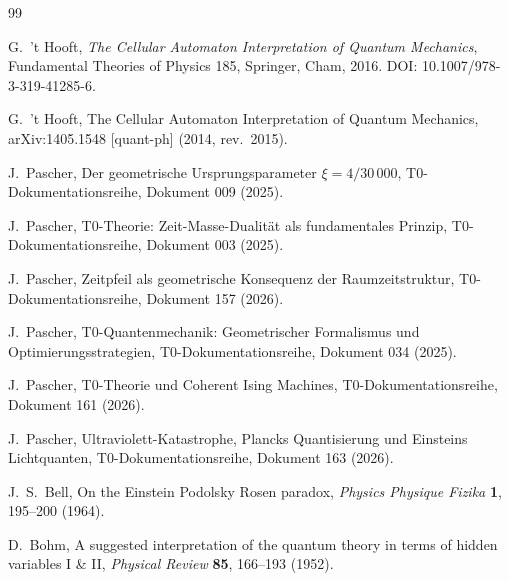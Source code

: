 \begin{thebibliography}{99}

G.\ 't Hooft,
\newblock \emph{The Cellular Automaton Interpretation of Quantum Mechanics},
\newblock Fundamental Theories of Physics 185,
\newblock Springer, Cham, 2016.
\newblock DOI: 10.1007/978-3-319-41285-6.

G.\ 't Hooft,
\newblock The Cellular Automaton Interpretation of Quantum Mechanics,
\newblock arXiv:1405.1548 [quant-ph] (2014, rev.\ 2015).

J.\ Pascher,
\newblock Der geometrische Ursprungsparameter $\xi = 4/30\,000$,
\newblock T0-Dokumentationsreihe, Dokument 009 (2025).

J.\ Pascher,
\newblock T0-Theorie: Zeit-Masse-Dualität als fundamentales Prinzip,
\newblock T0-Dokumentationsreihe, Dokument 003 (2025).

J.\ Pascher,
\newblock Zeitpfeil als geometrische Konsequenz der Raumzeitstruktur,
\newblock T0-Dokumentationsreihe, Dokument 157 (2026).

J.\ Pascher,
\newblock T0-Quantenmechanik: Geometrischer Formalismus und Optimierungsstrategien,
\newblock T0-Dokumentationsreihe, Dokument 034 (2025).

J.\ Pascher,
\newblock T0-Theorie und Coherent Ising Machines,
\newblock T0-Dokumentationsreihe, Dokument 161 (2026).

J.\ Pascher,
\newblock Ultraviolett-Katastrophe, Plancks Quantisierung und Einsteins Lichtquanten,
\newblock T0-Dokumentationsreihe, Dokument 163 (2026).

J.\ S.\ Bell,
\newblock On the Einstein Podolsky Rosen paradox,
\newblock \emph{Physics Physique Fizika} \textbf{1}, 195--200 (1964).

D.\ Bohm,
\newblock A suggested interpretation of the quantum theory in terms of
hidden variables I \& II,
\newblock \emph{Physical Review} \textbf{85}, 166--193 (1952).

\end{thebibliography}
